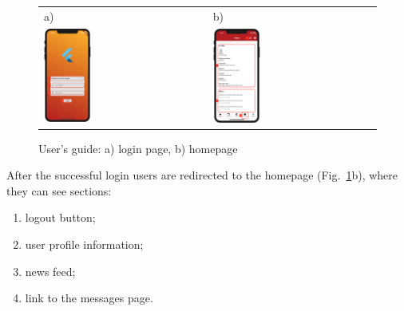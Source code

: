 \begin{figure}[htb]
    \centering
    \begin{tabular}{@{}ll@{}}
        a) & b) \\
        {\includegraphics[width=0.3\textwidth]{figC/login_page.png}} &
        {\includegraphics[width=0.3\textwidth]{figC/home_page.png}} \\
    \end{tabular}
    \caption{User's guide: a) login page, b) homepage} \label{fig:users-guide-login-home}
\end{figure}

After the successful login users are redirected to the homepage (Fig.~\ref{fig:users-guide-login-home}b), where they can see sections:
\begin{enumerate}
    \item logout button;
    \item user profile information;
    \item news feed;
    \item link to the messages page.
\end{enumerate}

